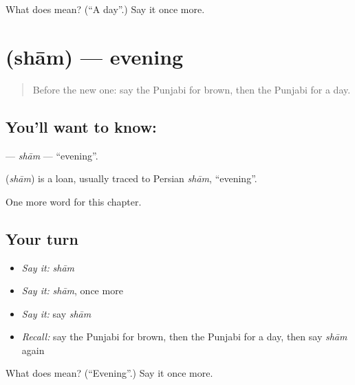 \begin{tcolorbox}[breakable,colback=teal!4,colframe=teal!35!black,title={Before you move on}]
What does  mean? (\textquotedblleft{}A day\textquotedblright{}.) Say it once more.
\end{tcolorbox}
\section[\texorpdfstring{\pa{ਸ਼ਾਮ} (shām)}{ਸ਼ਾਮ (shām)}]{ (shām) — evening}

\label{lesson:PA-C85-sham}



\begin{quote}
Before the new one: say the Punjabi for brown, then the Punjabi for a day.
\end{quote}

\subsection*{You'll want to know: }
\textbf{} — \emph{shām} — \textquotedblleft{}evening\textquotedblright{}.

\begin{cousinweb}
\textbf{} (\emph{shām}) is a loan, usually traced to Persian \emph{shām}, \textquotedblleft{}evening\textquotedblright{}.
\end{cousinweb}

\begin{grammarlens}[title={What you've built}]
One more word for this chapter.
\end{grammarlens}

\subsection*{Your turn}
\begin{itemize}
\raggedright
  \item \emph{Say it:} \emph{shām}
  \item \emph{Say it:} \emph{shām}, once more
  \item \emph{Say it:} say \emph{shām}
  \item \emph{Recall:} say the Punjabi for brown, then the Punjabi for a day, then say \emph{shām} again
\end{itemize}

\begin{tcolorbox}[breakable,colback=teal!4,colframe=teal!35!black,title={Before you move on}]
What does  mean? (\textquotedblleft{}Evening\textquotedblright{}.) Say it once more.
\end{tcolorbox}

